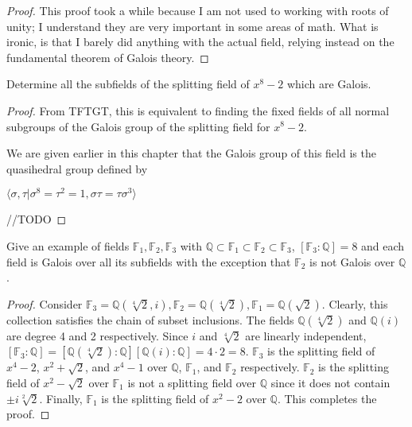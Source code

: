 \documentclass[10pt]{article}
\newcommand{\Q}{\mathbb{Q}}
\newenvironment{problem}[2][Problem]{\begin{trivlist}
		\item[\hskip \labelsep {\bfseries #1}\hskip \labelsep {\bfseries #2.}]}{\end{trivlist}}
\begin{document}
\begin{problem}{2.5}
\begin{proof}
			\rem
			This proof took a while because I am not used to working with roots of unity; I understand they are very important in some areas of math. What is ironic, is that I barely did anything with the actual field, relying instead on the fundamental theorem of Galois theory.
		\end{proof} 
	\end{problem}
	
	\begin{problem}{2.7}
		Determine all the subfields of the splitting field of $x^8 - 2$ which are Galois.
		\begin{proof}
			From TFTGT, this is equivalent to finding the fixed fields of all normal subgroups of the Galois group of the splitting field for $x^8-2$. 
			
			We are given earlier in this chapter that the Galois group of this field is the quasihedral group defined by
			\begin{center}
				$\langle \sigma, \tau | \sigma^8 = \tau^2 = 1, \sigma\tau = \tau\sigma^3 \rangle$
			\end{center}
			//TODO
		\end{proof}
	\end{problem}
	
	\begin{problem}{2.9}
		Give an example of fields $\mathbb{F}_1, \mathbb{F}_2, \mathbb{F}_3$ with $\Q \subset \mathbb{F}_1 \subset \mathbb{F}_2 \subset \mathbb{F}_3$, $[\mathbb{F}_3 : \Q] = 8$ and each field is Galois over all its subfields with the exception that $\mathbb{F}_2$ is not Galois over $\Q$.
		\begin{proof}
			Consider $\mathbb{F}_3 = \Q(\sqrt[4]{2}, i), \mathbb{F}_2 = \Q(\sqrt[4]{2}), \mathbb{F}_1 = \Q(\sqrt{2})$. Clearly, this collection satisfies the chain of subset inclusions. The fields $\Q(\sqrt[4]{2})$ and $\Q(i)$ are degree 4 and 2 respectively. Since $i$ and $\sqrt[4]{2}$ are linearly independent, $[\mathbb{F}_3:\Q] = [\Q(\sqrt[4]{2}):\Q][\Q(i):\Q] = 4\cdot2 = 8$. $\mathbb{F}_3$ is the splitting field of $x^4-2$, $x^2 + \sqrt{2}$, and $x^4 - 1$ over $\Q$, $\mathbb{F}_1$, and $\mathbb{F}_2$ respectively. $\mathbb{F}_2$ is the splitting field of $x^2-\sqrt{2}$ over $\mathbb{F}_1$ is not a splitting field over $\Q$ since it does not contain $\pm i\sqrt[2]{2}$. Finally, $\mathbb{F}_1$ is the splitting field of $x^2-2$ over $\Q$. This completes the proof.
		\end{proof}
	\end{problem}
	
\end{document}
